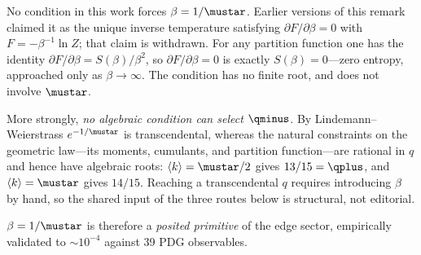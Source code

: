 \documentclass[12pt,a4paper]{article}
\begin{document}
\begin{remark}
\label{rem:gibbs_derivation}
No condition in this work forces $\beta = 1/\mustar$. Earlier versions
of this remark claimed it as the unique inverse temperature satisfying
$\partial F/\partial\beta = 0$ with $F = -\beta^{-1}\ln Z$; that claim
is withdrawn. For any partition function one has the identity
$\partial F/\partial\beta = S(\beta)/\beta^{2}$, so
$\partial F/\partial\beta = 0$ is exactly $S(\beta) = 0$---zero
entropy, approached only as $\beta \to \infty$. The condition has no
finite root, and does not involve $\mustar$.

More strongly, \emph{no algebraic condition can select} $\qminus$. By
Lindemann--Weierstrass $e^{-1/\mustar}$ is transcendental, whereas the
natural constraints on the geometric law---its moments, cumulants, and
partition function---are rational in $q$ and hence have algebraic
roots: $\langle k\rangle = \mustar/2$ gives $13/15 = \qplus$, and
$\langle k\rangle = \mustar$ gives $14/15$. Reaching a transcendental
$q$ requires introducing $\beta$ by hand, so the shared input of the
three routes below is structural, not editorial.

$\beta = 1/\mustar$ is therefore a \emph{posited primitive} of the edge
sector, empirically validated to $\sim 10^{-4}$ against 39 PDG
observables.
\end{remark}
\end{document}
